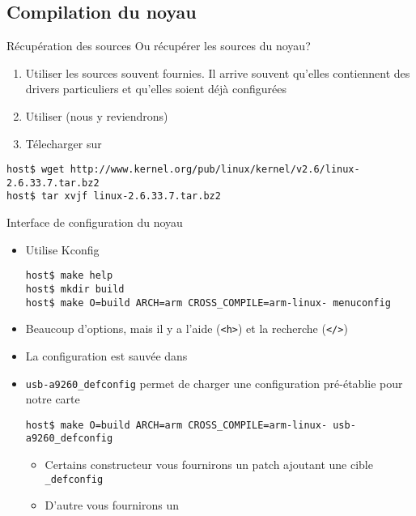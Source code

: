 \subsection{Compilation du noyau}

\begin{frame}[fragile=singleslide]{Récupération des sources}
  Ou récupérer les sources du noyau?
  \begin{enumerate}
  \item Utiliser  les sources souvent fournies.  Il arrive souvent
    qu'elles  contiennent  des  drivers particuliers  et  qu'elles
    soient déjà configurées
  \item Utiliser  (nous y reviendrons)
  \item Télecharger sur 
  \end{enumerate}
  \begin{lstlisting}
host$ wget http://www.kernel.org/pub/linux/kernel/v2.6/linux-2.6.33.7.tar.bz2
host$ tar xvjf linux-2.6.33.7.tar.bz2
  \end{lstlisting}
\end{frame}

\begin{frame}[fragile=singleslide]{Interface de configuration du noyau}
  \begin{itemize}
    \item Utilise Kconfig
      \begin{lstlisting}
host$ make help
host$ mkdir build
host$ make O=build ARCH=arm CROSS_COMPILE=arm-linux- menuconfig
       \end{lstlisting}
     \item  Beaucoup d'options,  mais il  y a  l'aide (\verb+<h>+)  et la
       recherche (\verb+</>+)
    \item La configuration est sauvée dans 
    \item    \verb+usb-a9260_defconfig+   permet   de    charger   une
      configuration pré-établie pour notre carte
      \begin{lstlisting}
host$ make O=build ARCH=arm CROSS_COMPILE=arm-linux- usb-a9260_defconfig          
      \end{lstlisting}
    \begin{itemize}
    \item Certains constructeur vous  fournirons un patch ajoutant une
      cible \verb+_defconfig+
    \item D'autre vous fournirons un 
    \end{itemize}
  \end{itemize}
\end{frame}

